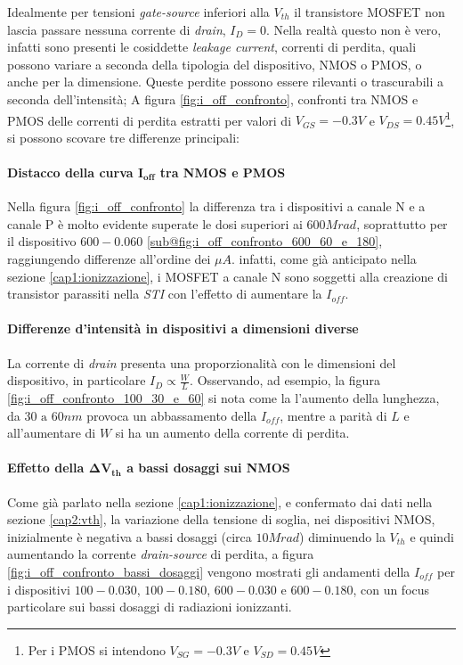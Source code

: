 Idealmente per tensioni \textit{gate-source} inferiori alla $V_{th}$ il transistore MOSFET non lascia passare nessuna corrente di \textit{drain}, $I_D = 0$. Nella realtà questo non è vero, infatti sono presenti le cosiddette \textit{leakage current}, correnti di perdita, quali possono variare a seconda della tipologia del dispositivo, NMOS o PMOS, o anche per la dimensione.
Queste perdite possono essere rilevanti o trascurabili a seconda dell'intensità; A figura \ref{fig:i_off_confronto}, confronti tra NMOS e PMOS delle correnti di perdita estratti per valori di $V_{GS} = -0.3V$ e $V_{DS} = 0.45V$\footnote{Per i PMOS si intendono $V_{SG} = -0.3V$ e $V_{SD} = 0.45V$}, si possono scovare tre differenze principali:
\paragraph*{Distacco della curva $\bm{I_{off}}$ tra NMOS e PMOS} Nella figura \ref{fig:i_off_confronto} la differenza tra i dispositivi a canale N e a canale P è molto evidente superate le dosi superiori ai $600Mrad$, soprattutto per il dispositivo $600-0.060$ \ref{sub@fig:i_off_confronto_600_60_e_180}, raggiungendo differenze all'ordine dei $\mu A$. infatti, come già anticipato nella sezione \ref{cap1:ionizzazione}, i MOSFET a canale N sono soggetti alla creazione di transistor parassiti nella \textit{STI} con l'effetto di aumentare la $I_{off}$.

\paragraph*{Differenze d'intensità in dispositivi a dimensioni diverse} La corrente di \textit{drain} presenta una proporzionalità con le dimensioni del dispositivo, in particolare $I_{D} \propto \frac{W}{L}$. Osservando, ad esempio, la figura \ref{fig:i_off_confronto_100_30_e_60} si nota come la l'aumento della lunghezza, da $30 \text{ a } 60nm$ provoca un abbassamento della $I_{off}$, mentre a parità di $L$ e all'aumentare di $W$ si ha un aumento della corrente di perdita.

\paragraph*{Effetto della $\bm{\Delta V_{th}}$ a bassi dosaggi sui NMOS} Come già parlato nella sezione \ref{cap1:ionizzazione}, e confermato dai dati nella sezione \ref{cap2:vth}, la variazione della tensione di soglia, nei dispositivi NMOS, inizialmente è negativa a bassi dosaggi (circa $10Mrad$) diminuendo la $V_{th}$ e quindi aumentando la corrente \textit{drain-source} di perdita, a figura \ref{fig:i_off_confronto_bassi_dosaggi} vengono mostrati gli andamenti della $I_{off}$ per i dispositivi $100-0.030$, $100-0.180$, $600-0.030$ e $600-0.180$, con un focus particolare sui bassi dosaggi di radiazioni ionizzanti.

